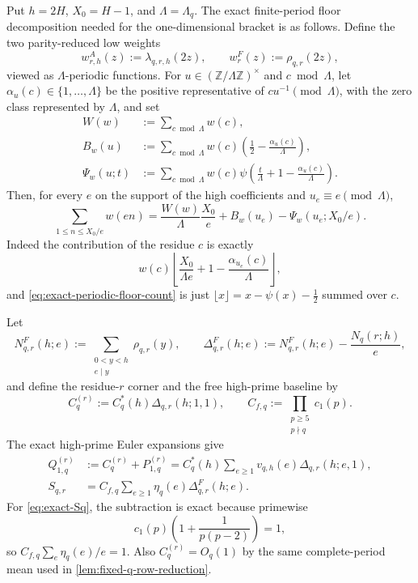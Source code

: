 \documentclass[11pt]{article}
\theoremstyle{definition}
\theoremstyle{remark}
\newcommand{\1}{\mathbf 1}
\newcommand{\e}{\mathrm e}
\begin{document}
Put $h=2H$, $X_0=H-1$, and $\Lambda=\Lambda_q$.  The exact finite-period
floor decomposition needed for the one-dimensional bracket is as follows.
Define the two parity-reduced low weights
\begin{equation}\label{eq:one-d-reduced-weights-q}
w^{A}_{r,h}(z):=\lambda_{q,r,h}(2z),
\qquad
w^{F}_{r}(z):=\rho_{q,r}(2z),
\end{equation}
viewed as $\Lambda$-periodic functions.  For
$u\in(\mathbb Z/\Lambda\mathbb Z)^\times$ and $c\bmod\Lambda$, let
$\alpha_u(c)\in\{1,\ldots,\Lambda\}$ be the positive representative of
$c u^{-1}\pmod\Lambda$, with the zero class represented by $\Lambda$, and set
\begin{align}
W(w)&:=\sum_{c\bmod\Lambda}w(c),\label{eq:one-d-W}\\
B_w(u)&:=\sum_{c\bmod\Lambda}w(c)
\left(\frac12-\frac{\alpha_u(c)}\Lambda\right),\label{eq:one-d-B}\\
\Psi_w(u;t)&:=\sum_{c\bmod\Lambda}w(c)
\psi\!\left(\frac t\Lambda+1-\frac{\alpha_u(c)}\Lambda\right).
\label{eq:one-d-Psi}
\end{align}
Then, for every $e$ on the support of the high coefficients and
$u_e\equiv e\pmod\Lambda$,
\begin{equation}\label{eq:exact-periodic-floor-count}
\boxed{
\sum_{1\le n\le X_0/e}w(en)
=\frac{W(w)}\Lambda\frac{X_0}{e}
+B_w(u_e)-\Psi_w(u_e;X_0/e).
}
\end{equation}
Indeed the contribution of the residue $c$ is exactly
\[
w(c)\left\lfloor
\frac{X_0}{\Lambda e}+1-\frac{\alpha_{u_e}(c)}\Lambda
\right\rfloor,
\]
and \eqref{eq:exact-periodic-floor-count} is just
$\lfloor x\rfloor=x-\psi(x)-\tfrac12$ summed over $c$.

Let
\[
N^F_{q,r}(h;e):=
\sum_{\substack{0<y<h\\e\mid y}}\rho_{q,r}(y),
\qquad
\Delta^F_{q,r}(h;e):=N^F_{q,r}(h;e)-\frac{N_q(r;h)}e,
\]
and define the residue-$r$ corner and the free high-prime baseline by
\[
C_q^{(r)}:=C_q^*(h)\Delta_{q,r}(h;1,1),
\qquad
C_{f,q}:=\prod_{\substack{p\ge5\\p\nmid q}}c_1(p).
\]
The exact high-prime Euler expansions give
\begin{align}
Q_{1,q}^{(r)}&:=C_q^{(r)}+P_{1,q}^{(r)}
=C_q^*(h)\sum_{e\ge1}v_{q,h}(e)\Delta_{q,r}(h;e,1),
\label{eq:exact-Q1q}\\
S_{q,r}&=C_{f,q}\sum_{e\ge1}\eta_q(e)\Delta^F_{q,r}(h;e).
\label{eq:exact-Sq}
\end{align}
For \eqref{eq:exact-Sq}, the subtraction is exact because primewise
\[
c_1(p)\left(1+\frac1{p(p-2)}\right)=1,
\]
so $C_{f,q}\sum_e\eta_q(e)/e=1$.  Also
$C_q^{(r)}=O_q(1)$ by the same complete-period mean used in
\cref{lem:fixed-q-row-reduction}.
\end{document}
